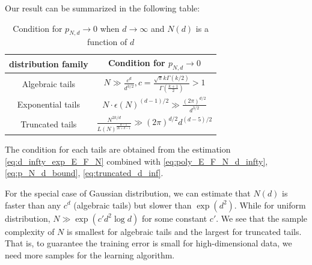 \documentclass{aptpub}
\begin{document}
Our result can be summarized in the following table:
\begin{table}
     \centering
     \begin{tabular}{|c|c|}
         \hline
         distribution family &  Condition for $p_{N,d} \to 0$ \\
         \hline
        Algebraic tails & $N \gg \frac{c^d}{d^{3/2}}, c=\frac{\sqrt{\pi}k\Gamma(k/2)}{\Gamma(\frac{k+1}{2})}>1$ \\
        \hline
        Exponential tails 
        & $ N\cdot \epsilon(N)^{(d-1)/2} \gg \frac{(2\pi)^{d/2}}{d^{3/2}}$ \\
        \hline
        Truncated tails 
        & $\frac{N^{2k/d}}{L(N)^{\frac{d-1}{2k+d-1}}}
        \gg (2\pi)^{d/2}d^{(d-5)/2}$\\
        \hline
     \end{tabular}
     \caption{Condition for $p_{N,d}\to 0$ when $d\to \infty$ and $N(d)$ is a function of $d$}
     \label{tab:cond}
 \end{table}
 The condition for each tails are obtained
 from the estimation \eqref{eq:d_infty_exp_E_F_N}
 combined with \eqref{eq:poly_E_F_N_d_infty},
 \eqref{eq:p_N_d_bound},
 \eqref{eq:truncated_d_inf}.

For the special case of Gaussian distribution, we can estimate that
$N(d)$ is faster than any $c^d$ (algebraic tails) but slower than $\exp(d^2)$.
While for uniform distribution, $N\gg \exp(c' d^2 \log d)$ for some constant $c'$.
We see that the sample complexity of $N$ is smallest for algebraic tails and the largest
for truncated tails. That is, to guarantee the training error is small for high-dimensional data,
we need more samples for the learning algorithm.




\appendix
\end{document}
